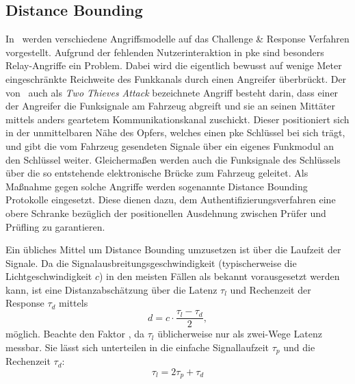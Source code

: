 \subsection{\foreignlanguage{english}{Distance Bounding}}

In~\cite{Alrabady2005} werden verschiedene Angriffsmodelle auf das \foreignlanguage{english}{Challenge \& Response} Verfahren vorgestellt. Aufgrund der fehlenden Nutzerinteraktion in \gls{pke} sind besonders \foreignlanguage{english}{Relay}-Angriffe ein Problem. Dabei wird die eigentlich bewusst auf wenige Meter eingeschränkte Reichweite des Funkkanals durch einen Angreifer überbrückt. Der von~\citeauthor{Alrabady2005} auch als \emph{\foreignlanguage{english}{Two Thieves Attack}} bezeichnete Angriff besteht darin, dass einer der Angreifer die Funksignale am Fahrzeug abgreift und sie an seinen Mittäter mittels anders geartetem Kommunikationskanal zuschickt. Dieser positioniert sich in der unmittelbaren Nähe des Opfers, welches einen \gls{pke} Schlüssel bei sich trägt, und gibt die vom Fahrzeug gesendeten Signale über ein eigenes Funkmodul an den Schlüssel weiter. Gleichermaßen werden auch die Funksignale des Schlüssels über die so entstehende elektronische Brücke zum Fahrzeug geleitet. Als Maßnahme gegen solche Angriffe werden sogenannte \foreignlanguage{english}{Distance Bounding} Protokolle eingesetzt. Diese dienen dazu, dem Authentifizierungsverfahren eine obere Schranke bezüglich der positionellen Ausdehnung zwischen Prüfer und Prüfling zu garantieren.

Ein übliches Mittel um \foreignlanguage{english}{Distance Bounding} umzusetzen ist über die Laufzeit der Signale. Da die Signalausbreitungsgeschwindigkeit (typischerweise die Lichtgeschwindigkeit \(c\)) in den meisten Fällen als bekannt vorausgesetzt werden kann, ist eine Distanzabschätzung über die Latenz \(\tau_{l}\) und Rechenzeit der \foreignlanguage{english}{Response} \(\tau_{d}\) mittels
%
\begin{equation*}
    d = c \cdot \frac{\tau_{l} - \tau_{d}}{2} {,}
\end{equation*}
%
möglich. Beachte den Faktor , da \(\tau_{l}\) üblicherweise nur als zwei-Wege Latenz messbar. Sie lässt sich unterteilen in die einfache Signallaufzeit \(\tau_{p}\) und die Rechenzeit \(\tau_{d}\):
%
\begin{equation*}
    \tau_{l} = 2 \tau_{p} + \tau_{d}
\end{equation*}

